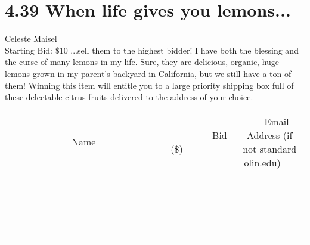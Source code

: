 \documentclass[11pt]{article}
\begin{document}
\section*{4.39 When life gives you lemons...}
Celeste Maisel
\\
Starting Bid: \$10
\newline
...sell them to the highest bidder!
I have both the blessing and the curse of many lemons in my life.  Sure, they are delicious, organic, huge lemons grown in my parent's backyard in California, but we still have a ton of them!  Winning this item will entitle you to a large priority shipping box full of these delectable citrus fruits delivered to the address of your choice.
\\[3ex]
\begin{tabular}{c c c}
~~~~~~~~~~~~~Name~~~~~~~~~~~~~ & ~~~~~~~~~Bid (\$)~~~~~~~~~  & ~~~Email Address (if not standard olin.edu)~~~\\
 & & \\
\hline
 & & \\
\hline
 & & \\
\hline
 & & \\
\hline
 & & \\
\hline
 & & \\
\hline
 & & \\
\hline
 & & \\
\hline
 & & \\
\hline
 & & \\
\hline
 & & \\
\hline
 & & \\
\hline
 & & \\
\hline
 & & \\
\hline
 & & \\
\hline
 & & \\
\hline
 & & \\
\hline
 & & \\
\hline
 & & \\
\hline
\end{tabular}
\newpage
\end{document}
